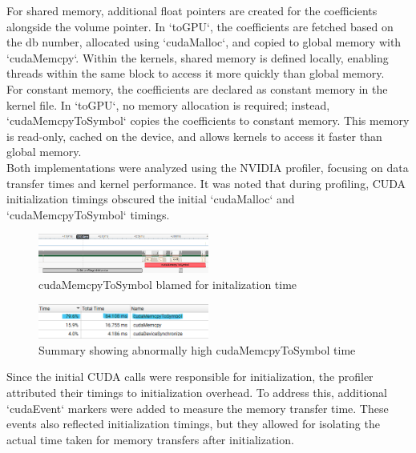 \documentclass[journal,11pt]{IEEEtran}
\begin{document}
For shared memory, additional float pointers are created for the coefficients alongside the volume pointer. In `toGPU`, the coefficients are fetched based on the db number, allocated using `cudaMalloc`, and copied to global memory with `cudaMemcpy`. Within the kernels, shared memory is defined locally, enabling threads within the same block to access it more quickly than global memory.\\

For constant memory, the coefficients are declared as constant memory in the kernel file. In `toGPU`, no memory allocation is required; instead, `cudaMemcpyToSymbol` copies the coefficients to constant memory. This memory is read-only, cached on the device, and allows kernels to access it faster than global memory.\\

Both implementations were analyzed using the NVIDIA profiler, focusing on data transfer times and kernel performance. It was noted that during profiling, CUDA initialization timings obscured the initial `cudaMalloc` and `cudaMemcpyToSymbol` timings.

\begin{figure}[h]
    \centering
    \includegraphics[width=0.5\textwidth]{assets/blamed-mem.png}
    \caption{cudaMemcpyToSymbol blamed for initalization time}
    \label{fig:4}
\end{figure}

\begin{figure}[h]
    \centering
    \includegraphics[width=0.5\textwidth]{assets/blamed-mem-sum.png}
    \caption{Summary showing abnormally high cudaMemcpyToSymbol time}
    \label{fig:5}
\end{figure}

Since the initial CUDA calls were responsible for initialization, the profiler attributed their timings to initialization overhead. To address this, additional `cudaEvent` markers were added to measure the memory transfer time. These events also reflected initialization timings, but they allowed for isolating the actual time taken for memory transfers after initialization.
\end{document}
